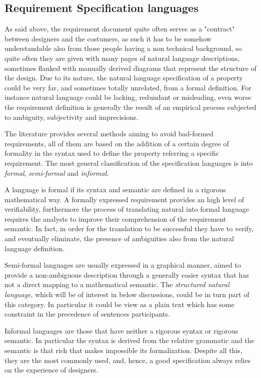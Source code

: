 \subsection{Requirement Specification languages}
As said above, the requirement document quite often serves as a "contract" between designers and the costumers, as such it has to be somehow understandable also from those people having a non technical background, so quite often they are given with many pages of natural language descriptions, sometimes flanked with manually derived diagrams that represent the structure of the design. Due to its nature, the natural language specification of a property could be very far, and sometimes totally unrelated, from a formal definition. For instance natural language could be lacking, redundant or misleading, even worse the requirement definition is generally the result of an empirical process subjected to ambiguity, subjectivity and imprecisions.
\par The literature provides several methods aiming to avoid bad-formed requirements, all of them are based on the addition of a certain degree of formality in the syntax used to define the property referring a specific requirement. The most general classification of the specification languages is into \textit{formal}, \textit{semi-formal} and \textit{informal}.
\par A language is formal if its syntax and semantic are defined in a rigorous mathematical way. A formally expressed requirement provides an high level of verifiability, furthermore the process of translating natural into formal language requires the analysts to improve their comprehension of the requirement semantic. In fact, in order for the translation to be successful they have to verify, and eventually eliminate, the presence of ambiguities also from the natural language definition.
\par Semi-formal languages are usually expressed in a graphical manner, aimed to provide a non-ambiguous description through a generally easier syntax that has not a direct mapping to a mathematical semantic. The \textit{structured natural language}, which will be of interest in below discussions, could be in turn part of this category. In particular it could be view as a plain text which has some constraint in the precedence of sentences participants.%
\par Informal languages are those that have neither a rigorous syntax or rigorous semantic. In particular the syntax is derived from the relative grammatic and the semantic is that rich that makes impossible its formalization. Despite all this, they are the most commonly used, and, hence, a good specification always relies on the experience of designers.

